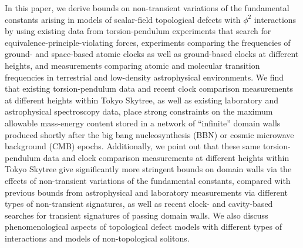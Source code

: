 \documentclass[aps,prd,onecolumn,nofootinbib]{revtex4-2} %
\begin{document}
In this paper, we derive bounds on non-transient variations of the fundamental constants arising in models of scalar-field topological defects with $\phi^2$ interactions by using existing data from torsion-pendulum experiments that search for equivalence-principle-violating forces, experiments comparing the frequencies of ground- and space-based atomic clocks as well as ground-based clocks at different heights, and measurements comparing atomic and molecular transition frequencies in terrestrial and low-density astrophysical environments. 
We find that existing torsion-pendulum data and recent clock comparison measurements at different heights within Tokyo Skytree, as well as existing laboratory and astrophysical spectroscopy data, place strong constraints on the maximum allowable mass-energy content stored in a network of ``infinite'' domain walls produced shortly after the big bang nucleosynthesis (BBN) or cosmic microwave background (CMB) epochs. 
Additionally, we point out that these same torsion-pendulum data and clock comparison measurements at different heights within Tokyo Skytree give significantly more stringent bounds on domain walls via the effects of non-transient variations of the fundamental constants, compared with previous bounds from astrophysical and laboratory measurements via different types of non-transient signatures, as well as recent clock- and cavity-based searches for transient signatures of passing domain walls. 
We also discuss phenomenological aspects of topological defect models with different types of interactions and models of non-topological solitons. 
\end{document}
